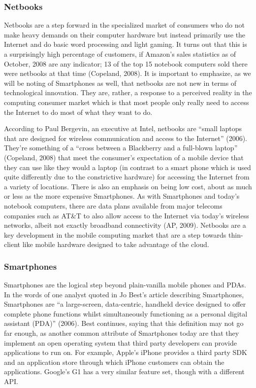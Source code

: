 \documentclass[12pt,oneside,letterpaper]{article}
\begin{document}
\subsubsection{Netbooks}

Netbooks are a step forward in the specialized market of consumers who do not
make heavy demands on their computer hardware but instead primarily use the
Internet and do basic word processing and light gaming.  It turns out that this
is a surprisingly high percentage of customers, if Amazon's sales statistics as
of October, 2008 are any indicator; 13 of the top 15 notebook computers sold
there were netbooks at that time (Copeland, 2008).  It is important to
emphasize, as we will be noting of Smartphones as well, that netbooks are not
new in terms of technological innovation.  They are, rather, a response to a
perceived reality in the computing consumer market which is that most people
only really need to access the Internet to do most of what they want to do.

According to Paul Bergevin, an executive at Intel, netbooks are ``small laptops
that are designed for wireless communication and access to the Internet'' (2006).
They're something of a ``cross between a Blackberry and a full-blown laptop''
(Copeland, 2008) that meet the consumer's expectation of a mobile device that
they can use like they would a laptop (in contrast to a smart phone which is
used quite differently due to the constrictive hardware) for accessing the
Internet from a variety of locations.  There is also an emphasis on being low
cost, about as much or less as the more expensive Smartphones.  As with
Smartphones and today's notebook computers, there are data plans available from
major telecoms companies such as AT\&T to also allow access to the Internet via
today's wireless networks, albeit not exactly broadband connectivity (AP, 2009).
Netbooks are a key development in the mobile computing market that are a step
towards thin-client like mobile hardware designed to take advantage of the
cloud.

\subsubsection{Smartphones}

Smartphones are the logical step beyond plain-vanilla mobile phones and PDAs.
In the words of one analyst quoted in Jo Best's article describing Smartphones,
Smartphones are ``a large-screen, data-centric, handheld device designed to offer
complete phone functions whilst simultaneously functioning as a personal digital
assistant (PDA)'' (2006).  Best continues, saying that this definition may not go
far enough, as another common attribute of Smartphones today are that they
implement an open operating system that third party developers can provide
applications to run on.  For example, Apple's iPhone provides a third party SDK
and an application store through which iPhone customers can obtain the
applications.  Google's G1 has a very similar feature set, though with a
different API.
\end{document}

